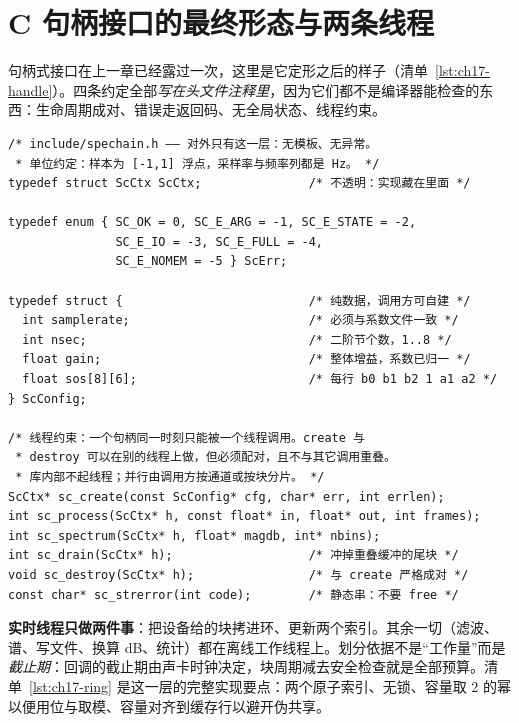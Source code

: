 \documentclass[12pt,a4paper,fontset=fandol]{ctexbook}
\begin{document}
\section{C 句柄接口的最终形态与两条线程}

句柄式接口在上一章已经露过一次，这里是它定形之后的样子（清单~\ref{lst:ch17-handle}）。四条约定全部\emph{写在头文件注释里}，因为它们都不是编译器能检查的东西：生命周期成对、错误走返回码、无全局状态、线程约束。

\begin{lstlisting}[style=cstyle,caption={对外的 C 句柄接口：成对生命周期、返回码、无全局状态},label={lst:ch17-handle}]
/* include/spechain.h —— 对外只有这一层：无模板、无异常。
 * 单位约定：样本为 [-1,1] 浮点，采样率与频率列都是 Hz。 */
typedef struct ScCtx ScCtx;               /* 不透明：实现藏在里面 */

typedef enum { SC_OK = 0, SC_E_ARG = -1, SC_E_STATE = -2,
               SC_E_IO = -3, SC_E_FULL = -4,
               SC_E_NOMEM = -5 } ScErr;

typedef struct {                          /* 纯数据，调用方可自建 */
  int samplerate;                         /* 必须与系数文件一致 */
  int nsec;                               /* 二阶节个数，1..8 */
  float gain;                             /* 整体增益，系数已归一 */
  float sos[8][6];                        /* 每行 b0 b1 b2 1 a1 a2 */
} ScConfig;

/* 线程约束：一个句柄同一时刻只能被一个线程调用。create 与
 * destroy 可以在别的线程上做，但必须配对，且不与其它调用重叠。
 * 库内部不起线程；并行由调用方按通道或按块分片。 */
ScCtx* sc_create(const ScConfig* cfg, char* err, int errlen);
int sc_process(ScCtx* h, const float* in, float* out, int frames);
int sc_spectrum(ScCtx* h, float* magdb, int* nbins);
int sc_drain(ScCtx* h);                   /* 冲掉重叠缓冲的尾块 */
void sc_destroy(ScCtx* h);                /* 与 create 严格成对 */
const char* sc_strerror(int code);        /* 静态串：不要 free */
\end{lstlisting}

\textbf{实时线程只做两件事}：把设备给的块拷进环、更新两个索引。其余一切（滤波、谱、写文件、换算 dB、统计）都在离线工作线程上。划分依据不是``工作量''而是\emph{截止期}：回调的截止期由声卡时钟决定，块周期减去安全检查就是全部预算。清单~\ref{lst:ch17-ring} 是这一层的完整实现要点：两个原子索引、无锁、容量取 $2$ 的幂以便用位与取模、容量对齐到缓存行以避开伪共享。
\end{document}
